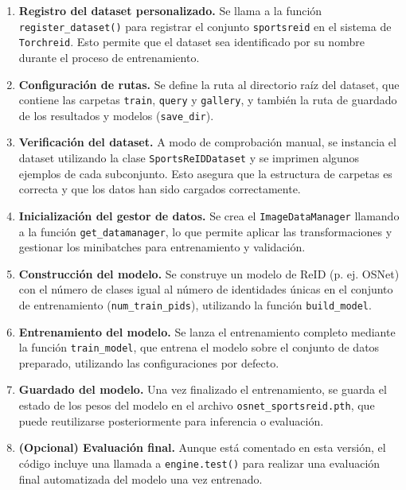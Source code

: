 \documentclass[12pt, a4paper, twoside]{article}
\begin{document}
	\begin{enumerate}
		\item \textbf{Registro del dataset personalizado.}  
		Se llama a la función \texttt{register\_dataset()} para registrar el conjunto \texttt{sportsreid} en el sistema de \texttt{Torchreid}. Esto permite que el dataset sea identificado por su nombre durante el proceso de entrenamiento.
		
		\item \textbf{Configuración de rutas.}  
		Se define la ruta al directorio raíz del dataset, que contiene las carpetas \texttt{train}, \texttt{query} y \texttt{gallery}, y también la ruta de guardado de los resultados y modelos (\texttt{save\_dir}).
		
		\item \textbf{Verificación del dataset.}  
		A modo de comprobación manual, se instancia el dataset utilizando la clase \texttt{SportsReIDDataset} y se imprimen algunos ejemplos de cada subconjunto. Esto asegura que la estructura de carpetas es correcta y que los datos han sido cargados correctamente.
		
		\item \textbf{Inicialización del gestor de datos.}  
		Se crea el \texttt{ImageDataManager} llamando a la función \texttt{get\_datamanager}, lo que permite aplicar las transformaciones y gestionar los minibatches para entrenamiento y validación.
		
		\item \textbf{Construcción del modelo.}  
		Se construye un modelo de ReID (p. ej. OSNet) con el número de clases igual al número de identidades únicas en el conjunto de entrenamiento (\texttt{num\_train\_pids}), utilizando la función \texttt{build\_model}.
		
		\item \textbf{Entrenamiento del modelo.}  
		Se lanza el entrenamiento completo mediante la función \texttt{train\_model}, que entrena el modelo sobre el conjunto de datos preparado, utilizando las configuraciones por defecto.
		
		\item \textbf{Guardado del modelo.}  
		Una vez finalizado el entrenamiento, se guarda el estado de los pesos del modelo en el archivo \texttt{osnet\_sportsreid.pth}, que puede reutilizarse posteriormente para inferencia o evaluación.
		
		\item \textbf{(Opcional) Evaluación final.}  
		Aunque está comentado en esta versión, el código incluye una llamada a \texttt{engine.test()} para realizar una evaluación final automatizada del modelo una vez entrenado.
	\end{enumerate}
	
\end{document}
